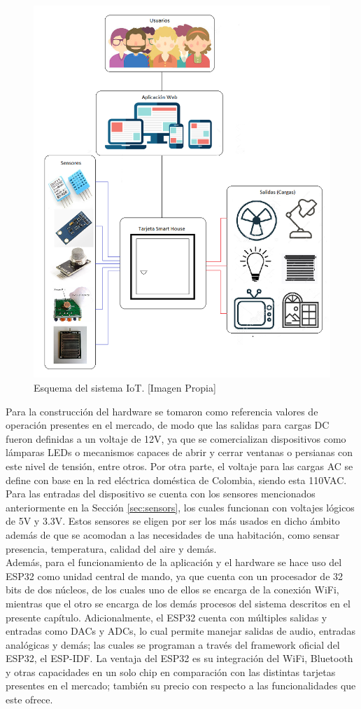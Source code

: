\begin{figure}[H]
	\centering
	\caption[Esquema del sistema IoT.]{Esquema del sistema IoT. [Imagen Propia]}
	\label{fig:diagramas}
	\includegraphics[width=0.7\linewidth]{Imagenes/Diagramas}
\end{figure}

Para la construcción del hardware se tomaron como referencia valores de operación presentes en el mercado, de modo que las salidas para cargas DC fueron definidas a un voltaje de 12V, ya que se comercializan dispositivos como lámparas LEDs o mecanismos capaces de abrir y cerrar ventanas o persianas con este nivel de tensión, entre otros. Por otra parte, el voltaje para las cargas AC se define con base en la red eléctrica doméstica de Colombia, siendo esta 110VAC. Para las entradas del dispositivo se cuenta con los sensores mencionados anteriormente en la Sección \ref{sec:sensors}, los cuales funcionan con voltajes lógicos de 5V y 3.3V. Estos sensores se eligen por ser los más usados en dicho ámbito además de que se acomodan a las necesidades de una habitación, como sensar presencia, temperatura, calidad del aire y demás.\\

Además, para el funcionamiento de la aplicación y el hardware se hace uso del ESP32 como unidad central de mando, ya que cuenta con un procesador de 32 bits de dos núcleos, de los cuales uno de ellos se encarga de la conexión WiFi, mientras que el otro se encarga de los demás procesos del sistema descritos en el presente capítulo. Adicionalmente, el ESP32 cuenta con múltiples salidas y entradas como DACs y ADCs, lo cual permite manejar salidas de audio, entradas analógicas y demás; las cuales se programan a través del framework oficial del ESP32, el ESP-IDF. La ventaja del ESP32 es su integración del WiFi, Bluetooth y otras capacidades en un solo chip en comparación con las distintas tarjetas presentes en el mercado; también su precio con respecto a las funcionalidades que este ofrece.\\

